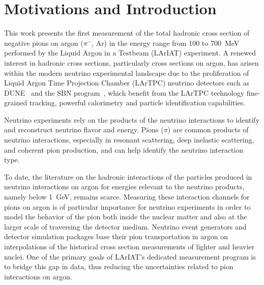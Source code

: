\documentclass[%
 floatfix,
 reprint,
 twocolumn,
superscriptaddress,
showpacs,preprintnumbers,
 amsmath,amssymb,
 aps,
prd,
]{revtex4-1}
\begin{document}
\section{\label{sec:Motivations}Motivations and Introduction}
This work presents the first measurement of the total hadronic cross section of negative pions on argon ($\pi^-$, Ar) in the energy range from 100 to 700~MeV performed by the Liquid Argon in a Testbeam (LArIAT) experiment. 
A renewed interest in hadronic cross sections, particularly cross sections on argon, has arisen within the modern neutrino experimental landscape due to the proliferation of Liquid Argon Time Projection Chamber (LArTPC) neutrino detectors such as DUNE~\cite{DUNE-CDRvol1} and the SBN program~\cite{sbn}, which benefit from the LArTPC technology fine-grained tracking, powerful calorimetry and particle identification capabilities. 

Neutrino experiments rely on the products of the neutrino interactions to identify and reconstruct neutrino flavor and energy. Pions ($\pi$) are common products of neutrino interactions, especially in resonant scattering, deep inelastic scattering, and coherent pion production, and can help identify the neutrino interaction type.

To date, the literature on the hadronic interactions of the particles produced in neutrino interactions on argon for energies relevant to the neutrino products, namely below  1~GeV, remains scarce. Measuring these interaction channels for pions on argon is of particular importance for neutrino experiments in order to model the behavior of the pion both inside the nuclear matter and also at the larger scale of traversing the detector medium. Neutrino event generators and detector simulation packages base their pion transportation in argon on interpolations of the historical cross section measurements of lighter and heavier nuclei. One of the primary goals of LArIAT's dedicated measurement program is to bridge this gap in data, thus reducing the uncertainties related to pion interactions on argon.
\end{document}
